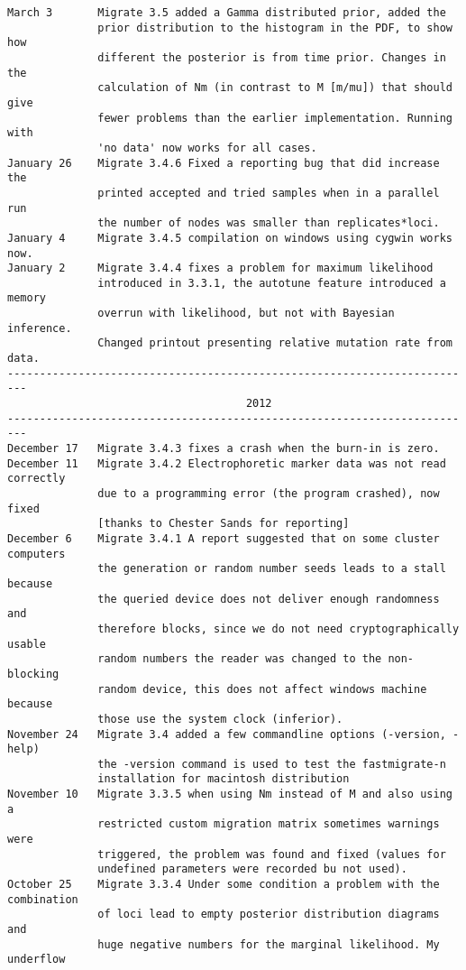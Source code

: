 \begin{small}
\begin{verbatim}
March 3       Migrate 3.5 added a Gamma distributed prior, added the 
              prior distribution to the histogram in the PDF, to show how
              different the posterior is from time prior. Changes in the 
              calculation of Nm (in contrast to M [m/mu]) that should give
              fewer problems than the earlier implementation. Running with
              'no data' now works for all cases.
January 26    Migrate 3.4.6 Fixed a reporting bug that did increase the
              printed accepted and tried samples when in a parallel run
              the number of nodes was smaller than replicates*loci. 
January 4     Migrate 3.4.5 compilation on windows using cygwin works now.
January 2     Migrate 3.4.4 fixes a problem for maximum likelihood
              introduced in 3.3.1, the autotune feature introduced a memory
              overrun with likelihood, but not with Bayesian inference.
              Changed printout presenting relative mutation rate from data.
-------------------------------------------------------------------------
                                     2012
-------------------------------------------------------------------------
December 17   Migrate 3.4.3 fixes a crash when the burn-in is zero.
December 11   Migrate 3.4.2 Electrophoretic marker data was not read correctly
              due to a programming error (the program crashed), now fixed 
              [thanks to Chester Sands for reporting]
December 6    Migrate 3.4.1 A report suggested that on some cluster computers
              the generation or random number seeds leads to a stall because
              the queried device does not deliver enough randomness and
              therefore blocks, since we do not need cryptographically usable
              random numbers the reader was changed to the non-blocking
              random device, this does not affect windows machine because
              those use the system clock (inferior).
November 24   Migrate 3.4 added a few commandline options (-version, -help)
              the -version command is used to test the fastmigrate-n 
              installation for macintosh distribution 
November 10   Migrate 3.3.5 when using Nm instead of M and also using a
              restricted custom migration matrix sometimes warnings were
              triggered, the problem was found and fixed (values for 
              undefined parameters were recorded bu not used).
October 25    Migrate 3.3.4 Under some condition a problem with the combination
              of loci lead to empty posterior distribution diagrams and 
              huge negative numbers for the marginal likelihood. My underflow

\end{verbatim}
\end{small}
